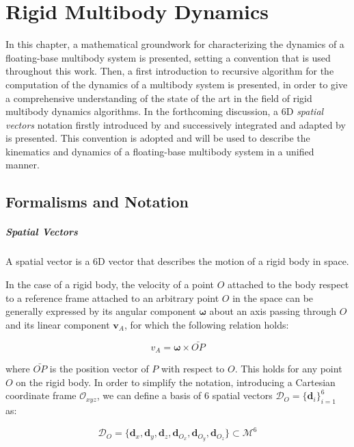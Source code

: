 \chapter{Rigid Multibody Dynamics}
\label{chp:back_RBDynamics}

In this chapter, a mathematical groundwork for characterizing the dynamics of a floating-base multibody system is presented, setting a convention that is used throughout this work. Then, a first introduction to recursive algorithm for the computation of the dynamics of a multibody system is presented, in order to give a comprehensive understanding of the state of the art in the field of rigid multibody dynamics algorithms. In the forthcoming discussion, a 6D \textit{spatial vectors} notation firstly introduced by \citet{featherstone_rigid_2008} and successively integrated and adapted by \citet{traversaro_multibody_2019} is presented. This convention is adopted and will be used to describe the kinematics and dynamics of a floating-base multibody system in a unified manner.

\section{Formalisms and Notation}

\paragraph{Spatial Vectors} A spatial vector is a 6D vector that describes the motion of a rigid body in space.

In the case of a rigid body, the velocity of a point $O$ attached to the body respect to a reference frame attached to an arbitrary point $O$ in the space can be generally expressed by its angular component $\mathbf{\omega}$ about an axis passing through $O$ and its linear component $\mathbf{v} _A$, for which the following relation holds:

\begin{equation}
    v _A = \mathbf{\omega} \times \bar{OP}
\end{equation}

where $\bar{OP}$ is the position vector of $P$ with respect to $O$. This holds for any point $O$ on the rigid body. In order to simplify the notation, introducing a Cartesian coordinate frame $\mathcal{O} _{xyz}$, we can define a basis of 6 spatial vectors $\mathcal{D} _O = \{\mathbf{d} _i\} ^6 _{i=1}$ as:

\begin{equation}
    \mathcal{D} _O = \{\mathbf{d} _x, \mathbf{d} _y, \mathbf{d} _z, \mathbf{d} _{O _x}, \mathbf{d} _{O _y}, \mathbf{d} _{O _z} \} \subset \mathcal{M} ^6
\end{equation}

